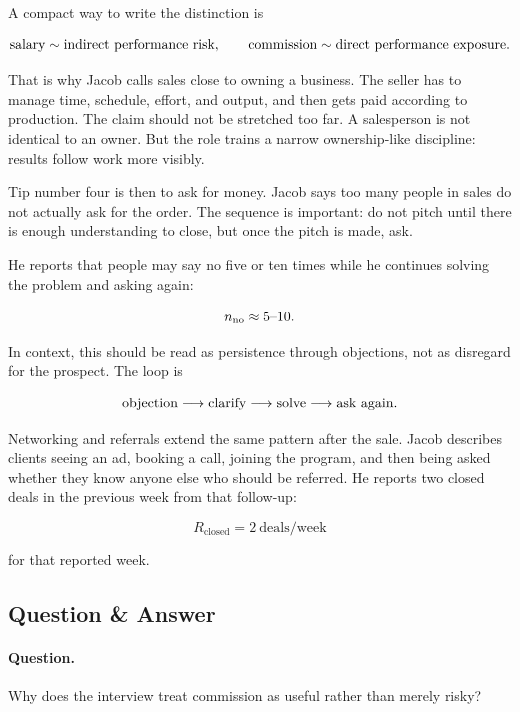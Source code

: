 A compact way to write the distinction is

\begin{equation}
\hbox{salary} \sim \hbox{indirect performance risk},
\qquad
\hbox{commission} \sim \hbox{direct performance exposure}.
\end{equation}

That is why Jacob calls sales close to owning a business. The seller has to manage time, schedule, effort, and output, and then gets paid according to production. The claim should not be stretched too far. A salesperson is not identical to an owner. But the role trains a narrow ownership-like discipline: results follow work more visibly.

Tip number four is then to ask for money. Jacob says too many people in sales do not actually ask for the order. The sequence is important: do not pitch until there is enough understanding to close, but once the pitch is made, ask.

He reports that people may say no five or ten times while he continues solving the problem and asking again:

\begin{equation}
n_{\mathrm{no}} \approx 5\hbox{--}10.
\end{equation}

In context, this should be read as persistence through objections, not as disregard for the prospect. The loop is

\begin{equation}
\hbox{objection}
\longrightarrow
\hbox{clarify}
\longrightarrow
\hbox{solve}
\longrightarrow
\hbox{ask again}.
\end{equation}

Networking and referrals extend the same pattern after the sale. Jacob describes clients seeing an ad, booking a call, joining the program, and then being asked whether they know anyone else who should be referred. He reports two closed deals in the previous week from that follow-up:

\begin{equation}
R_{\mathrm{closed}} = 2\ \mathrm{deals/week}
\end{equation}

for that reported week.

\subsection{Question \& Answer}

\paragraph{Question.}
Why does the interview treat commission as useful rather than merely risky?

